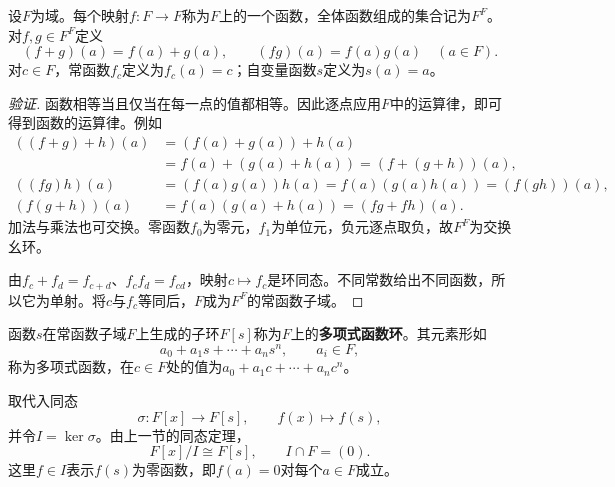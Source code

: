 \begin{definition}\label{p2:concept:c3-functions}
设$F$为域。每个映射$f:F\to F$称为$F$上的一个函数，全体函数组成的集合记为$F^F$。对$f,g\in F^F$定义
\[
(f+g)(a)=f(a)+g(a),\qquad(fg)(a)=f(a)g(a)\quad(a\in F).
\]
对$c\in F$，常函数$f_c$定义为$f_c(a)=c$；自变量函数$s$定义为$s(a)=a$。
\end{definition}
\begin{proof}[验证]
函数相等当且仅当在每一点的值都相等。因此逐点应用$F$中的运算律，即可得到函数的运算律。例如
\begin{align*}
((f+g)+h)(a)&=(f(a)+g(a))+h(a)\\
&=f(a)+(g(a)+h(a))=(f+(g+h))(a),\\
((fg)h)(a)&=(f(a)g(a))h(a)=f(a)(g(a)h(a))=(f(gh))(a),\\
(f(g+h))(a)&=f(a)(g(a)+h(a))=(fg+fh)(a).
\end{align*}
\label{p2:concept:c3-zero-function}加法与乘法也可交换。零函数$f_0$为零元，$f_1$为单位元，负元逐点取负，故$F^F$为交换幺环。

\label{p2:concept:c3-constant-subfield}由$f_c+f_d=f_{c+d}$、$f_cf_d=f_{cd}$，映射$c\mapsto f_c$是环同态。不同常数给出不同函数，所以它为单射。将$c$与$f_c$等同后，$F$成为$F^F$的常函数子域。
\end{proof}

\begin{definition}\label{p2:concept:c3-polynomial-functions}
函数$s$在常函数子域$F$上生成的子环$F[s]$称为$F$上的\textbf{多项式函数环}。其元素形如
\[
a_0+a_1s+\cdots+a_ns^n,\qquad a_i\in F,
\]
称为多项式函数，在$c\in F$处的值为$a_0+a_1c+\cdots+a_nc^n$。
\end{definition}

取代入同态
\[
\sigma:F[x]\to F[s],\qquad f(x)\mapsto f(s),
\]
并令$I=\ker\sigma$。由上一节的同态定理，
\[
F[x]/I\cong F[s],\qquad I\cap F=(0).
\]
这里$f\in I$表示$f(s)$为零函数，即$f(a)=0$对每个$a\in F$成立。

